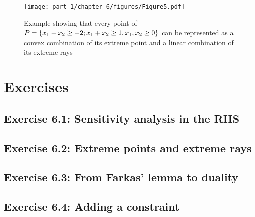 \begin{figure}[h]
	\texttt{[image: part\_1/chapter\_6/figures/Figure5.pdf]}
	\caption{Example showing that every point of $P = \left\{ x_1 - x_2 \geq -2; x_1 + x_2 \geq 1, x_1,x_2 \geq 0 \right \}$ can be represented as a convex combination of its extreme point and a linear combination of its extreme rays} \label{p1c6:fig:resolution_example}
\end{figure}

\pagebreak	

\section*{Exercises}

\subsection*{Exercise 6.1: Sensitivity analysis in the RHS}


\subsection*{Exercise 6.2: Extreme points and extreme rays}


\subsection*{Exercise 6.3: From Farkas' lemma to duality}


\subsection*{Exercise 6.4: Adding a constraint}







